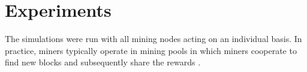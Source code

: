 \section{Experiments}
The simulations were run with all mining nodes acting on an individual basis. In practice, miners typically operate in mining pools in which miners cooperate to find new blocks and subsequently share the rewards \cite{Rosenfeld}.
